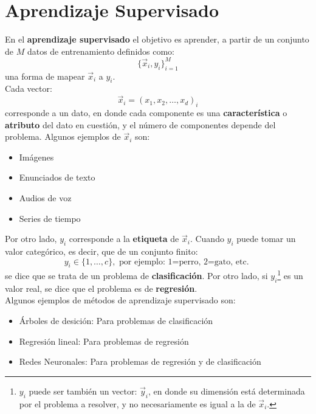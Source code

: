\section{Aprendizaje Supervisado}
En el \textbf{aprendizaje supervisado} el objetivo es aprender, a partir de un conjunto de $M$ datos de entrenamiento definidos como:
\begin{equation}
\{\vec{x}_i, y_i\}_{i=1}^{M}
\end{equation}
una forma de mapear $\vec{x}_i$ a $y_i$.
\\
Cada vector:
\begin{equation}
\vec{x}_i = (x_1,x_2, \dots , x_d)_i\label{eq:trainset}
\end{equation}
corresponde a un dato, en donde cada componente es una \textbf{característica} o \textbf{atributo} del dato en cuestión, y el número de componentes depende del problema. Algunos ejemplos de $\vec{x}_i$ son:
\begin{itemize}[label=\textcolor{CTtitle}{\textbullet}]
\item Imágenes
\item Enunciados de texto
\item Audios de voz
\item Series de tiempo
\end{itemize}

Por otro lado, $y_i$ corresponde a la \textbf{etiqueta} de $\vec{x}_i$. Cuando $y_i$ puede tomar un valor categórico, es decir, que de un conjunto finito:
$$y_i \in \{1,\dots,c\}, \text{  por ejemplo: 1=perro, 2=gato, etc. }$$ 
se dice que se trata de un problema de \textbf{clasificación}. Por otro lado, si $y_i$\footnote{$y_i$ puede ser también un vector: $\vec{y}_i$, en donde su dimensión está determinada por el problema a resolver, y no necesariamente es igual a la de $\vec{x}_i$.} es un valor real, se dice que el problema es de \textbf{regresión}.
\\

Algunos ejemplos de métodos de aprendizaje supervisado son:
\begin{itemize}[label=\textcolor{CTtitle}{\textbullet}]
\item Árboles de desición: Para problemas de clasificación
\item Regresión lineal: Para problemas de regresión
\item Redes Neuronales: Para problemas de regresión y de clasificación
\end{itemize}

